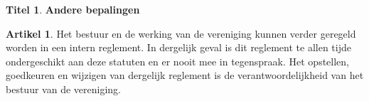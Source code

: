 \documentclass[a4paper,10pt]{article}
\theoremstyle{definition}
\newtheorem{titel}{\newline\Large Titel}
\newtheorem{artikelbase}{\large Artikel}
\newenvironment{artikel}
  {\begin{artikelbase}}
  {\smallskip
   \end{artikelbase}}
\newcommand{\ttext}[1]{\Large \textbf{#1} \normalsize}
\newcommand{\ttextcr}{\hfill\newline}
\begin{document}

\begin{titel}\ttext{Andere bepalingen}

  \begin{artikel}\label{varia-reglement}\ttextcr
    Het bestuur en de werking van de vereniging kunnen verder geregeld worden in een intern reglement.
    In dergelijk geval is dit reglement te allen tijde ondergeschikt aan deze statuten en er nooit mee in tegenspraak.
    Het opstellen, goedkeuren en wijzigen van dergelijk reglement is de verantwoordelijkheid van het bestuur van de vereniging.
  \end{artikel}

\end{titel}
\end{document}
